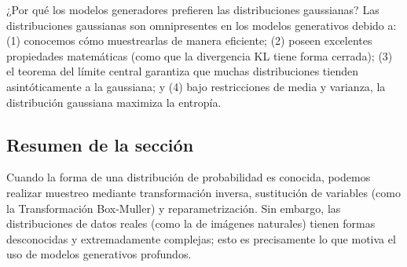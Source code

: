 \begin{knowledgebox}{¿Por qué los modelos generadores prefieren las distribuciones gaussianas?}
Las distribuciones gaussianas son omnipresentes en los modelos generativos debido a: (1) conocemos cómo muestrearlas de manera eficiente; (2) poseen excelentes propiedades matemáticas (como que la divergencia KL tiene forma cerrada); (3) el teorema del límite central garantiza que muchas distribuciones tienden asintóticamente a la gaussiana; y (4) bajo restricciones de media y varianza, la distribución gaussiana maximiza la entropía.
\end{knowledgebox}

\subsection{Resumen de la sección}

Cuando la forma de una distribución de probabilidad es conocida, podemos realizar muestreo mediante transformación inversa, sustitución de variables (como la Transformación Box-Muller) y reparametrización. Sin embargo, las distribuciones de datos reales (como la de imágenes naturales) tienen formas desconocidas y extremadamente complejas; esto es precisamente lo que motiva el uso de modelos generativos profundos.

\newpage
